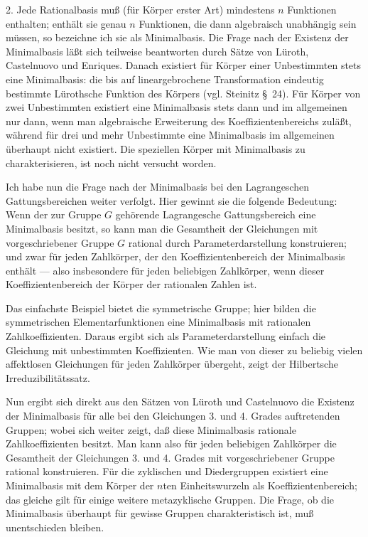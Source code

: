 2. Jede Rationalbasis muß (für Körper erster Art) mindestens $n$ Funktionen enthalten; enthält sie genau $n$ Funktionen, die dann algebraisch unabhängig sein müssen, so bezeichne ich sie als \glqq{}Minimalbasis\grqq{}. Die Frage nach der Existenz der Minimalbasis läßt sich teilweise beantworten durch Sätze von Lüroth, Castelnuovo und Enriques. Danach existiert für Körper einer Unbestimmten stets eine Minimalbasis: die bis auf lineargebrochene Transformation eindeutig bestimmte Lürothsche Funktion des Körpers (vgl. Steinitz \S\ 24). Für Körper von zwei Unbestimmten existiert eine Minimalbasis stets dann und im allgemeinen nur dann, wenn man algebraische Erweiterung des Koeffizientenbereichs zuläßt, während für drei und mehr Unbestimmte eine Minimalbasis im allgemeinen überhaupt nicht existiert. Die speziellen Körper mit Minimalbasis zu charakterisieren, ist noch nicht versucht worden.

Ich habe nun die Frage nach der Minimalbasis bei den Lagrangeschen Gattungsbereichen weiter verfolgt. Hier gewinnt sie die folgende Bedeutung: \glqq{}Wenn der zur Gruppe $G$ gehörende Lagrangesche Gattungsbereich eine Minimalbasis besitzt, so kann man die Gesamtheit der Gleichungen mit vorgeschriebener Gruppe $G$ rational durch Parameterdarstellung konstruieren; und zwar für jeden Zahlkörper, der den Koeffizientenbereich der Minimalbasis enthält --- also insbesondere für jeden beliebigen Zahlkörper, wenn dieser Koeffizientenbereich der Körper der rationalen Zahlen ist.\grqq{}

Das einfachste Beispiel bietet die symmetrische Gruppe; hier bilden die symmetrischen Elementarfunktionen eine Minimalbasis mit rationalen Zahlkoeffizienten. Daraus ergibt sich als Parameterdarstellung einfach die Gleichung mit unbestimmten Koeffizienten. Wie man von dieser zu beliebig vielen affektlosen Gleichungen für jeden Zahlkörper übergeht, zeigt der Hilbertsche Irreduzibilitätssatz.

Nun ergibt sich direkt aus den Sätzen von Lüroth und Castelnuovo die Existenz der Minimalbasis für alle bei den Gleichungen 3. und 4. Grades auftretenden Gruppen; wobei sich weiter zeigt, daß diese Minimalbasis rationale Zahlkoeffizienten besitzt. Man kann also für jeden beliebigen Zahlkörper die Gesamtheit der Gleichungen 3. und 4. Grades mit vorgeschriebener Gruppe rational konstruieren. Für die zyklischen und Diedergruppen existiert eine Minimalbasis mit dem Körper der $n$ten Einheitswurzeln als Koeffizientenbereich; das gleiche gilt für einige weitere metazyklische Gruppen. Die Frage, ob die Minimalbasis überhaupt für gewisse Gruppen charakteristisch ist, muß unentschieden bleiben.

